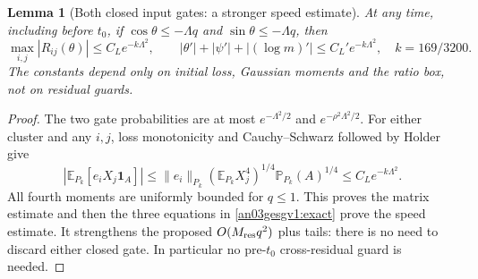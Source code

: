 \documentclass[11pt]{article}
\newtheorem{lemma}[proposition]{Lemma}
\theoremstyle{remark}\newtheorem{remark}[proposition]{Remark}
\newcommand{\E}{\mathbb E}
\newcommand{\one}{\mathbf1}
\begin{document}
\begin{lemma}[Both closed input gates: a stronger speed estimate]
\label{an03gesgv1:interiorspeed}
At any time, including before $t_0$, if
$\cos\theta\le-\Lambda q$ and $\sin\theta\le-\Lambda q$,
then
\begin{equation}
 \max_{i,j}|R_{ij}(\theta)|\le C_L e^{-k\Lambda^2},\qquad
 |\theta'|+|\psi'|+| (\log m)'|\le C_L' e^{-k\Lambda^2},
 \quad k=169/3200.
 \label{an03gesgv1:interiorspeedbound}
\end{equation}
The constants depend only on initial loss, Gaussian moments
and the ratio box, not on residual guards.
\end{lemma}
\begin{proof}
The two gate probabilities are at most
$e^{-\Lambda^2/2}$ and $e^{-\rho^2\Lambda^2/2}$.
For either cluster and any $i,j$, loss monotonicity and
Cauchy--Schwarz followed by Holder give
\[
 |\E_{P_k}[e_iX_j\one_A]|
 \le\|e_i\|_{P_k}(\E_{P_k}X_j^4)^{1/4}
                         \mathbb P_{P_k}(A)^{1/4}
 \le C_L e^{-k\Lambda^2}.
\]
All fourth moments are uniformly bounded for $q\le1$.
This proves the matrix estimate and then the three equations
in \eqref{an03gesgv1:exact} prove the speed estimate.
It strengthens the proposed $O(M_{\rm res}q^2)$ plus tails:
there is no need to discard either closed gate. In particular
no pre-$t_0$ cross-residual guard is needed.
\end{proof}
\end{document}
